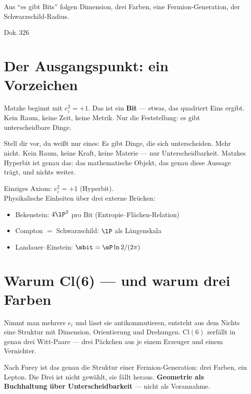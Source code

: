 
\epigraph{Aus \enquote{es gibt Bits} folgen Dimension, drei Farben,
eine Fermion-Generation, der Schwarzschild-Radius.}{Dok.\,326}

\section{Der Ausgangspunkt: ein Vorzeichen}

Matzke beginnt mit $e_i^2 = +1$. Das ist ein \textbf{Bit} --- etwas, das
quadriert Eins ergibt. Kein Raum, keine Zeit, keine Metrik. Nur die
Feststellung: es gibt unterscheidbare Dinge. 

\begin{laierspur}
Stell dir vor, du weißt nur eines: Es gibt Dinge, die sich unterscheiden.
Mehr nicht. Kein Raum, keine Kraft, keine Materie --- nur Unterscheidbarkeit.
Matzkes Hyperbit ist genau das: das mathematische Objekt, das genau diese
Aussage trägt, und nichts weiter.
\end{laierspur}

\begin{matzbox}
 Einziges Axiom: $e_i^2 = +1$ (Hyperbit).\\[4pt]
Physikalische Einheiten über drei externe Brücken:
\begin{itemize}
  \item Bekenstein: $4\lP^2$ pro Bit (Entropie--Flächen-Relation)
  \item Compton $=$ Schwarzschild: $\lP$ als Längenskala
  \item Landauer--Einstein: $\mbit = \mP \ln 2 / (2\pi)$
\end{itemize}
\end{matzbox}

\section{Warum Cl(6) --- und warum drei Farben}

Nimmt man mehrere $e_i$ und lässt sie antikommutieren, entsteht aus dem
Nichts eine Struktur mit Dimension, Orientierung und Drehungen. $\mathrm{Cl}(6)$
zerfällt in genau drei Witt-Paare --- drei Päckchen aus je einem Erzeuger
und einem Vernichter. 

Nach Furey ist das genau die Struktur einer Fermion-Generation: drei Farben,
ein Lepton. Die Drei ist nicht gewählt, sie fällt heraus.
\textbf{Geometrie als Buchhaltung über Unterscheidbarkeit} --- nicht als
Vorannahme.

